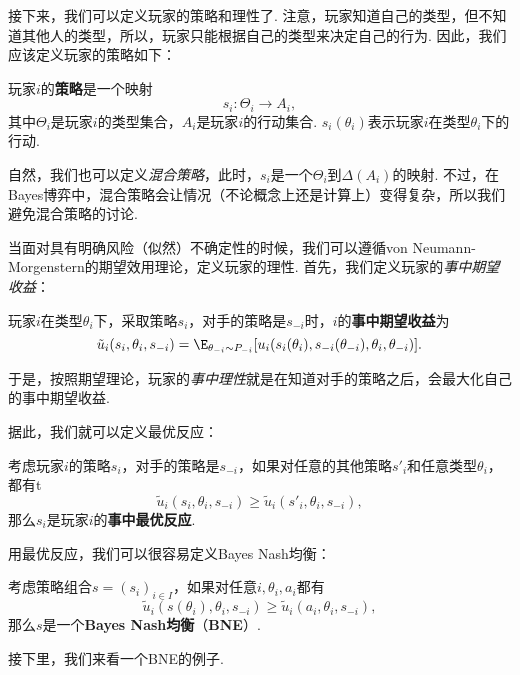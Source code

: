接下来，我们可以定义玩家的策略和理性了. 注意，玩家知道自己的类型，但不知道其他人的类型，所以，玩家只能根据自己的类型来决定自己的行为. 因此，我们应该定义玩家的策略如下：

\begin{definition}[策略]
    玩家$i$的\textbf{策略}是一个映射
    \[s_i:\Theta_i\to A_i,\]
    其中$\Theta_i$是玩家$i$的类型集合，$A_i$是玩家$i$的行动集合. $s_i(\theta_i)$表示玩家$i$在类型$\theta_i$下的行动.
\end{definition}

\begin{remark}
    自然，我们也可以定义\emph{混合策略}，此时，$s_i$是一个$\Theta_i$到$\Delta(A_i)$的映射. 不过，在Bayes博弈中，混合策略会让情况（不论概念上还是计算上）变得复杂，所以我们避免混合策略的讨论.
\end{remark}

当面对具有明确风险（似然）不确定性的时候，我们可以遵循von Neumann-Morgenstern的期望效用理论，定义玩家的理性. 首先，我们定义玩家的\emph{事中期望收益}：

\begin{definition}[事中期望收益]
    玩家$i$在类型$\theta_i$下，采取策略$s_i$，对手的策略是$s_{-i}$时，$i$的\textbf{事中期望收益}为
    \[\tilde u_i(s_i,\theta_i,s_{-i})=\E_{\theta_{-i}\sim P_{-i}}[u_i(s_i(\theta_i),s_{-i}(\theta_{-i}),\theta_i,\theta_{-i})].\]
\end{definition}

于是，按照期望理论，玩家的\emph{事中理性}就是在知道对手的策略之后，会最大化自己的事中期望收益. 

据此，我们就可以定义最优反应：

\begin{definition}[事中最优反应]
    考虑玩家$i$的策略$s_i$，对手的策略是$s_{-i}$，如果对任意的其他策略$s'_i$和任意类型$\theta_i$，都有t
    \[\tilde u_i(s_i,\theta_i,s_{-i})\geq \tilde u_i(s'_i,\theta_i,s_{-i}),\]
    那么$s_i$是玩家$i$的\textbf{事中最优反应}.
\end{definition}

用最优反应，我们可以很容易定义Bayes Nash均衡：

\begin{definition}
    考虑策略组合$s=(s_i)_{i\in I}$，如果对任意$i,\theta_i,a_i$都有
    \[\tilde u_i(s(\theta_i),\theta_i,s_{-i})\geq \tilde u_i(a_i,\theta_i,s_{-i}),\]
    那么$s$是一个\textbf{Bayes Nash均衡}（\textbf{BNE}）.
\end{definition}

接下里，我们来看一个BNE的例子. 

